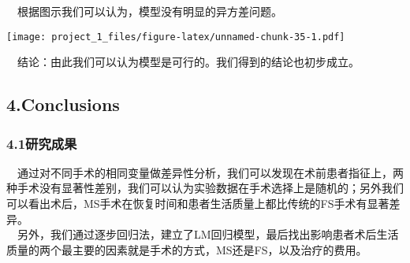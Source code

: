 \documentclass[
]{article}
\newenvironment{Shaded}{\begin{snugshade}}{\end{snugshade}}
\newcommand{\AttributeTok}[1]{\textcolor[rgb]{0.77,0.63,0.00}{#1}}
\newcommand{\CommentTok}[1]{\textcolor[rgb]{0.56,0.35,0.01}{\textit{#1}}}
\newcommand{\DecValTok}[1]{\textcolor[rgb]{0.00,0.00,0.81}{#1}}
\newcommand{\FunctionTok}[1]{\textcolor[rgb]{0.00,0.00,0.00}{#1}}
\newcommand{\NormalTok}[1]{#1}
\newcommand{\OtherTok}[1]{\textcolor[rgb]{0.56,0.35,0.01}{#1}}
\newcommand{\SpecialCharTok}[1]{\textcolor[rgb]{0.00,0.00,0.00}{#1}}
\newcommand{\StringTok}[1]{\textcolor[rgb]{0.31,0.60,0.02}{#1}}
\begin{document}
 根据图示我们可以认为，模型没有明显的异方差问题。

\begin{Shaded}
\end{Shaded}

\texttt{[image: project\_1\_files/figure-latex/unnamed-chunk-35-1.pdf]}

 结论：由此我们可以认为模型是可行的。我们得到的结论也初步成立。

\hypertarget{conclusions}{%
\subsection{4.Conclusions}\label{conclusions}}

\hypertarget{ux7814ux7a76ux6210ux679c}{%
\subsubsection{4.1研究成果}\label{ux7814ux7a76ux6210ux679c}}

 通过对不同手术的相同变量做差异性分析，我们可以发现在术前患者指征上，两种手术没有显著性差别，我们可以认为实验数据在手术选择上是随机的；另外我们可以看出术后，MS手术在恢复时间和患者生活质量上都比传统的FS手术有显著差异。\\
 另外，我们通过逐步回归法，建立了LM回归模型，最后找出影响患者术后生活质量的两个最主要的因素就是手术的方式，MS还是FS，以及治疗的费用。
\end{document}
